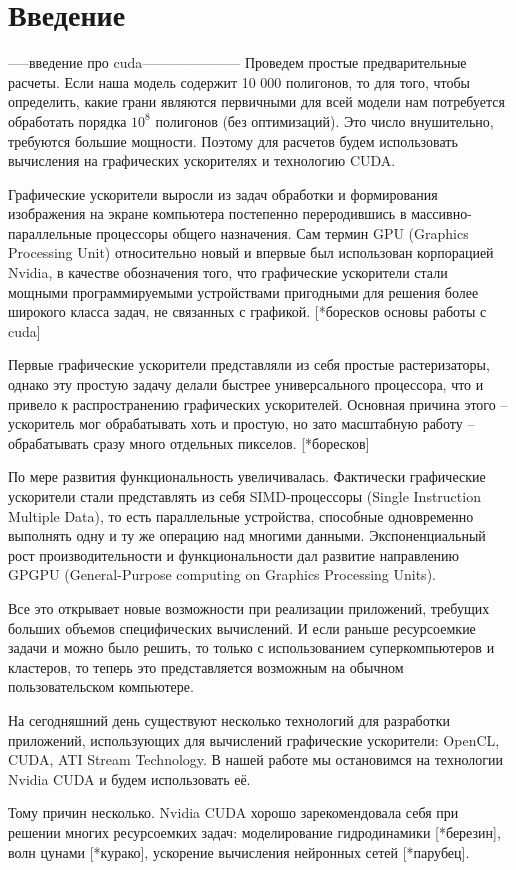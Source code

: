 \section*{Введение}

-----введение про cuda---------------------
Проведем простые предварительные расчеты. Если наша модель содержит 10 000 полигонов, то для того, чтобы  определить, какие грани являются первичными для всей модели нам потребуется обработать порядка $ 10^8 $ полигонов (без оптимизаций). Это число внушительно, требуются большие мощности. Поэтому для расчетов будем использовать вычисления на графических ускорителях и технологию CUDA. 

Графические ускорители выросли из задач обработки и формирования изображения на экране компьютера постепенно переродившись в массивно-параллельные процессоры общего назначения. Сам термин GPU (Graphics Processing Unit) относительно новый и впервые был использован корпорацией Nvidia, в качестве обозначения того, что графические ускорители стали мощными программируемыми устройствами пригодными для решения более широкого класса задач, не связанных с графикой. [*боресков основы работы с cuda]

Первые графические ускорители представляли из себя простые растеризаторы, однако эту простую задачу делали быстрее универсального процессора, что и привело к распространению графических ускорителей. Основная причина этого -- ускоритель мог обрабатывать хоть и простую, но зато масштабную работу -- обрабатывать сразу много отдельных пикселов. [*боресков]

По мере развития функциональность увеличивалась. Фактически графические ускорители стали представлять из себя SIMD-процессоры (Single Instruction Multiple Data), то есть параллельные устройства, способные одновременно выполнять одну и ту же операцию над многими данными. Экспоненциальный рост производительности и функциональности дал развитие направлению GPGPU (General-Purpose computing on Graphics Processing Units). 

Все это открывает новые возможности при реализации приложений, требущих больших объемов специфических вычислений. И если раньше ресурсоемкие задачи и можно было решить, то только с использованием суперкомпьютеров и кластеров, то теперь это представляется возможным на обычном пользовательском  компьютере. 

На сегодняшний день существуют несколько технологий для разработки приложений, использующих для вычислений графические ускорители: OpenCL, CUDA, ATI Stream Technology. В нашей работе мы остановимся на технологии Nvidia CUDA и будем использовать её. 

Тому причин несколько. Nvidia CUDA хорошо зарекомендовала себя при решении многих ресурсоемких задач: моделирование гидродинамики [*березин], волн цунами [*курако], ускорение вычисления нейронных сетей [*парубец].



